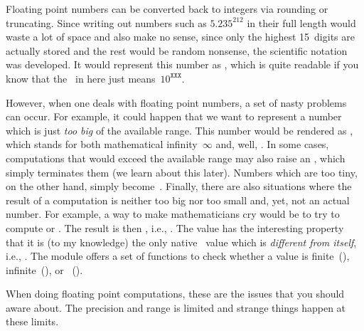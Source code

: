Floating point numbers can be converted back to integers via rounding or truncating.
Since writing out numbers such as $5.235^{212}$ in their full length would waste a lot of space and also make no sense, since only the highest 15~digits are actually stored and the rest would be random nonsense, the scientific notation was developed.
It would represent this number as , which is quite readable if you know that the~ in  here just means~$10^{\mathtt{XXX}}$.

However, when one deals with floating point numbers, a set of nasty problems can occur.
For example, it could happen that we want to represent a number which is just \emph{too big} of the available range.
This number would be rendered as , which stands for both mathematical infinity~$\infty$ and, well, .
In some cases, computations that would exceed the available range may also raise an , which simply terminates them (we learn about this later).
Numbers which are too tiny, on the other hand, simply become~.
Finally, there are also situations where the result of a computation is neither too big nor too small and, yet, not an actual number.
For example, a way to make mathematicians cry would be to try to compute  or .
The result is then , i.e., .
The value  has the interesting property that it is (to my knowledge) the only native \python\ value which is \emph{different from itself}, i.e., .
The  module offers a set of functions to check whether a value is finite~(), infinite~(), or ~().

When doing floating point computations, these are the issues that you should aware about.
The precision and range is limited and strange things happen at these limits.%
%
\endhsection%
%
\FloatBarrier%
\endhsection%
%
